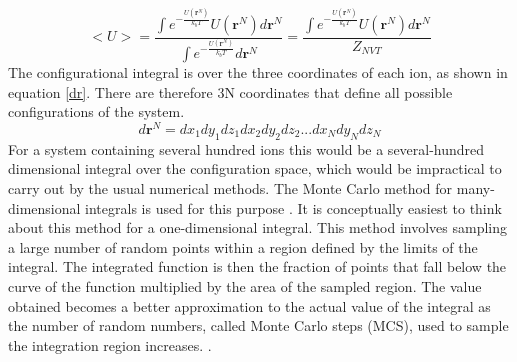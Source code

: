 \documentclass[11pt, twoside]{report}
\begin{document}
\begin{equation}\label{MC_av}
<U> = \frac{ \int e^{-\frac{U(\mathbf{r}^N)}{k_bT}} U(\mathbf{r}^N) d\mathbf{r}^N}{\int e^{-\frac{U(\mathbf{r}^N)}{k_bT}} d\mathbf{r}^N}  = \frac{  \int e^{-\frac{U(\mathbf{r}^N)}{k_bT}} U(\mathbf{r}^N) d\mathbf{r}^N}{Z_{NVT}} 
\end{equation}
The configurational integral is over the three coordinates of each ion, as shown in equation \ref{dr}. There are therefore 3N coordinates that define all possible configurations of the system.
\begin{equation}d \mathbf{r}^N = dx_1 dy_1 dz_1 dx_2 dy_2 dz_2... dx_N dy_N dz_N\end{equation}\label{dr}
For a system containing several hundred ions this would be a several-hundred dimensional integral over the configuration space, which would be impractical to carry out by the usual numerical methods. The Monte Carlo method for many-dimensional integrals is used for this purpose \cite{Metropolis}. It is conceptually easiest to think about this method for a one-dimensional integral. This method involves sampling a large number of random points within a region defined by the limits of the integral. The integrated function is then the fraction of points that fall below the curve of the function multiplied by the area of the sampled region. The value obtained becomes a better approximation to the actual value of the integral as the number of random numbers, called Monte Carlo steps (MCS), used to sample the integration region increases. \cite{Lesar3}.
\end{document}
